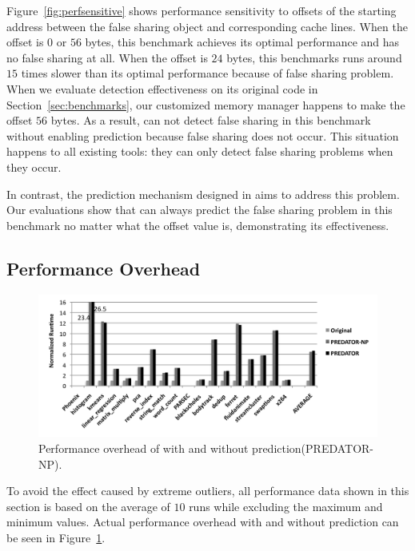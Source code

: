 Figure~\ref{fig:perfsensitive} shows performance sensitivity to 
offsets of the starting address between the false sharing object and corresponding cache lines. 
When the offset is $0$ or $56$ bytes, this benchmark achieves its optimal performance 
and has no false sharing at all.
When the offset is $24$ bytes, this benchmarks runs around $15$ times slower 
than its optimal performance because of false sharing problem.
When we evaluate detection effectiveness on its original code in Section~\ref{sec:benchmarks}, 
our customized memory manager happens to make the offset $56$ bytes. 
As a result, \Predator{} can not detect false sharing in this benchmark 
without enabling prediction because false sharing does not occur.
This situation happens to all existing tools: they can only detect false sharing problems when
they occur. 

In contrast, the prediction mechanism designed in \predator{} 
aims to address this problem. Our evaluations show 
that \Predator{} can always predict the false sharing problem in this
benchmark no matter what the offset value is, demonstrating its effectiveness.

\subsection{Performance Overhead}
\label{sec:perfoverhead}

\begin{figure}[!ht]
\begin{center}
\includegraphics[width=6.5in]{fig/perf}
\end{center}
\caption{
Performance overhead of \Predator{} with and without prediction(PREDATOR-NP).
\label{fig:perf}}
\end{figure}

To avoid the effect caused by extreme outliers, all performance data shown in this section
is based on the average of $10$ runs while excluding the maximum and minimum values.
Actual performance overhead with and without prediction 
can be seen in Figure~\ref{fig:perf}. 

